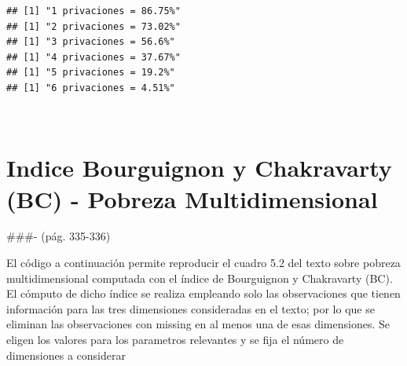 \documentclass[
]{book}
\newenvironment{Shaded}{\begin{snugshade}}{\end{snugshade}}
\newcommand{\AttributeTok}[1]{\textcolor[rgb]{0.77,0.63,0.00}{#1}}
\newcommand{\CommentTok}[1]{\textcolor[rgb]{0.56,0.35,0.01}{\textit{#1}}}
\newcommand{\ConstantTok}[1]{\textcolor[rgb]{0.00,0.00,0.00}{#1}}
\newcommand{\ControlFlowTok}[1]{\textcolor[rgb]{0.13,0.29,0.53}{\textbf{#1}}}
\newcommand{\DecValTok}[1]{\textcolor[rgb]{0.00,0.00,0.81}{#1}}
\newcommand{\FunctionTok}[1]{\textcolor[rgb]{0.00,0.00,0.00}{#1}}
\newcommand{\NormalTok}[1]{#1}
\newcommand{\OtherTok}[1]{\textcolor[rgb]{0.56,0.35,0.01}{#1}}
\newcommand{\SpecialCharTok}[1]{\textcolor[rgb]{0.00,0.00,0.00}{#1}}
\newcommand{\StringTok}[1]{\textcolor[rgb]{0.31,0.60,0.02}{#1}}
\begin{document}
\begin{Shaded}
\end{Shaded}

\begin{verbatim}
## [1] "1 privaciones = 86.75%"
## [1] "2 privaciones = 73.02%"
## [1] "3 privaciones = 56.6%"
## [1] "4 privaciones = 37.67%"
## [1] "5 privaciones = 19.2%"
## [1] "6 privaciones = 4.51%"
\end{verbatim}

~

\hypertarget{indice-bourguignon-y-chakravarty-bc---pobreza-multidimensional}{%
\section{Indice Bourguignon y Chakravarty (BC) - Pobreza Multidimensional}\label{indice-bourguignon-y-chakravarty-bc---pobreza-multidimensional}}

\#\#\#- (pág. 335-336)

El código a continuación permite reproducir el cuadro 5.2 del texto sobre pobreza multidimensional computada con el índice de Bourguignon y Chakravarty (BC). El cómputo de dicho índice se realiza empleando solo las observaciones que tienen información para las tres dimensiones consideradas en el texto; por lo que se eliminan las observaciones con missing en al menos una de esas dimensiones. Se eligen los valores para los parametros relevantes y se fija el número de dimensiones a considerar
\end{document}
